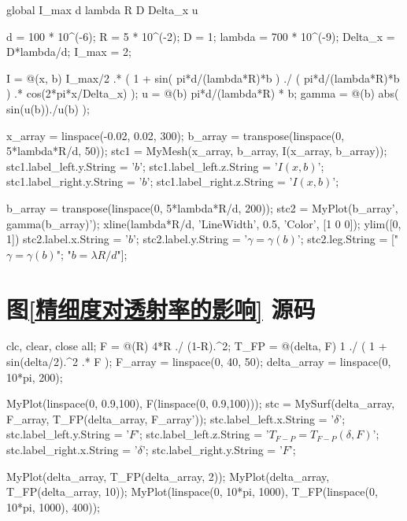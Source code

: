 \documentclass[UTF8]{report}
\theoremstyle{MyLineTheoremStyle} %
\theoremstyle{MyBlockTheoremStyle} %
\theoremstyle{MySubsubsectionStyle} %
\begin{document}
\begin{matlablisting}
global I_max d lambda R D Delta_x u

d = 100 * 10^(-6);
R = 5 * 10^(-2);
D = 1;
lambda = 700 * 10^(-9); %
Delta_x = D*lambda/d;
I_max = 2;

I = @(x, b) I_max/2 .* (  1 + sin( pi*d/(lambda*R)*b ) ./ ( pi*d/(lambda*R)*b ) .* cos(2*pi*x/Delta_x) );
u = @(b) pi*d/(lambda*R) * b;
gamma = @(b) abs( sin(u(b))./u(b) );

x_array = linspace(-0.02, 0.02, 300);
b_array = transpose(linspace(0, 5*lambda*R/d, 50));
stc1 = MyMesh(x_array, b_array, I(x_array, b_array));
stc1.label_left.y.String = '$b$';
stc1.label_left.z.String = '$I(x, b)$';
stc1.label_right.y.String = '$b$';
stc1.label_right.z.String = '$I(x, b)$';

b_array = transpose(linspace(0, 5*lambda*R/d, 200));
stc2 = MyPlot(b_array', gamma(b_array)');
xline(lambda*R/d, 'LineWidth', 0.5, 'Color', [1 0 0]);
ylim([0, 1])
stc2.label.x.String = '$b$';
stc2.label.y.String = '$\gamma = \gamma(b)$';
stc2.leg.String = ["$\gamma = \gamma(b)$"; "$b = \lambda R / d$"];
\end{matlablisting}

\section{图\ref{精细度对透射率的影响} 源码}\label{精细度对透射率的影响 源码}

\begin{matlablisting}
clc, clear, close all;
F = @(R) 4*R ./ (1-R).^2;
T_FP = @(delta, F) 1 ./ ( 1 + sin(delta/2).^2 .* F  );
F_array = linspace(0, 40, 50);
delta_array = linspace(0, 10*pi, 200);

MyPlot(linspace(0, 0.9,100), F(linspace(0, 0.9,100)));
stc = MySurf(delta_array, F_array, T_FP(delta_array, F_array'));
stc.label_left.x.String = '$\delta$';
stc.label_left.y.String = '$F$';
stc.label_left.z.String = '$T_{F-P} = T_{F-P}(\delta, F)$';
stc.label_right.x.String = '$\delta$';
stc.label_right.y.String = '$F$';

MyPlot(delta_array, T_FP(delta_array, 2));
MyPlot(delta_array, T_FP(delta_array, 10));
MyPlot(linspace(0, 10*pi, 1000), T_FP(linspace(0, 10*pi, 1000), 400));
\end{matlablisting}


\end{document}
